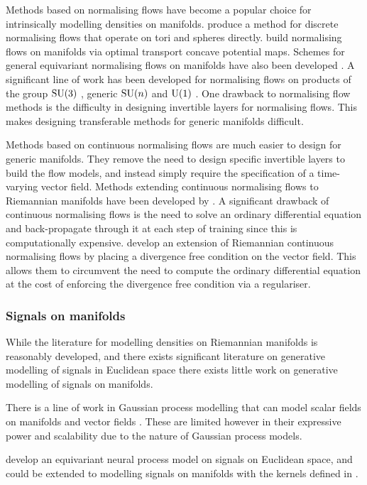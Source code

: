 Methods based on normalising flows have become a popular choice for intrinsically modelling densities on manifolds.
\textcite{rezende2020Normalizing} produce a method for discrete normalising flows that operate on tori and spheres directly.
\textcite{cohen2021riemannian,rezende2021implicit} build normalising flows on manifolds via optimal transport concave potential maps.
Schemes for general equivariant normalising flows on manifolds have also been developed \cite{katsman2021equivariant}.
A significant line of work has been developed for normalising flows on products of the group \(\groupSU[3]\) \cite{abbott2022sampling, abbott2022gauge, abbott2023normalizing}, generic \(\groupSU\) \cite{boyda2021sampling} and \(\groupU[1]\) \cite{kanwar2020equivariant}.
One drawback to normalising flow methods is the difficulty in designing invertible layers for normalising flows.
This makes designing transferable methods for generic manifolds difficult.

Methods based on continuous normalising flows are much easier to design for generic manifolds.
They remove the need to design specific invertible layers to build the flow models, and instead simply require the specification of a time-varying vector field.
Methods extending continuous normalising flows to Riemannian manifolds have been developed by \textcite{falorsi2020neural, falorsi2021Continuous, mathieu2020riemannian, lou2020eural}.
A significant drawback of continuous normalising flows is the need to solve an ordinary differential equation and back-propagate through it at each step of training since this is computationally expensive.
\textcite{rozen2021moser} develop an extension of Riemannian continuous normalising flows by placing a divergence free condition on the vector field. 
This allows them to circumvent the need to compute the ordinary differential equation at the cost of enforcing the divergence free condition via a regulariser.

\subsubsection{Signals on manifolds}

While the literature for modelling densities on Riemannian manifolds is reasonably developed, and there exists significant literature on generative modelling of signals in Euclidean space \cite{goodfellow2014generative,kingma2013auto,rezende2014stochastic,rezende15variational,tabak2010density,tabak2013family,chen2018neural,grathwohl2019scalable,song2020score,sohl2015deep,ho2020denoising} there exists little work on generative modelling of signals on manifolds.

There is a line of work in Gaussian process modelling that can model scalar fields on manifolds \cite{Borovitskiy2020,azangulov2023stationary,azangulov2023stationary2} and vector fields \cite{hutchinson2021vector}.
These are limited however in their expressive power and scalability due to the nature of Gaussian process models.

\textcite{holderith2021equivariant} develop an equivariant neural process model on signals on Euclidean space, and could be extended to modelling signals on manifolds with the kernels defined in \textcite{hutchinson2021vector}.
